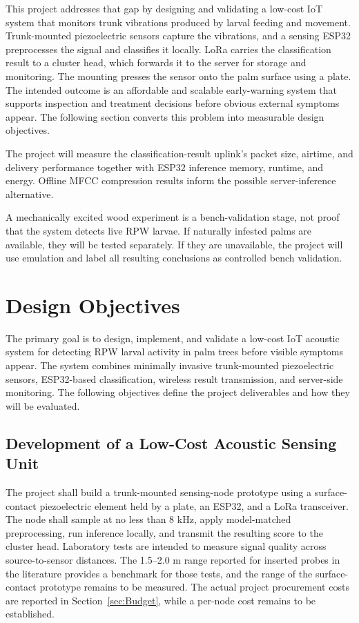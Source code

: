 \documentclass[12pt,a4paper,oneside]{memoir}
\newcommand{\newrevision}[1]{#1}
\begin{document}
\newrevision{This project addresses that gap by designing and validating a low-cost IoT system that monitors trunk vibrations produced by larval feeding and movement. Trunk-mounted piezoelectric sensors capture the vibrations, and a sensing ESP32 preprocesses the signal and classifies it locally. LoRa carries the classification result to a cluster head, which forwards it to the server for storage and monitoring. The mounting presses the sensor onto the palm surface using a plate. The intended outcome is an affordable and scalable early-warning system that supports inspection and treatment decisions before obvious external symptoms appear. The following section converts this problem into measurable design objectives.}

\newrevision{The project will measure the classification-result uplink's packet size, airtime, and delivery performance together with ESP32 inference memory, runtime, and energy. Offline MFCC compression results inform the possible server-inference alternative.}

\newrevision{A mechanically excited wood experiment is a bench-validation stage, not proof that the system detects live RPW larvae. If naturally infested palms are available, they will be tested separately. If they are unavailable, the project will use emulation and label all resulting conclusions as controlled bench validation.}
 
\section{Design Objectives}
\label{sec:Objectives}
 
\newrevision{The primary goal is to design, implement, and validate a low-cost IoT acoustic system for detecting RPW larval activity in palm trees before visible symptoms appear. The system combines minimally invasive trunk-mounted piezoelectric sensors, ESP32-based classification, wireless result transmission, and server-side monitoring. The following objectives define the project deliverables and how they will be evaluated.}
 
\subsection{Development of a Low-Cost Acoustic Sensing Unit}
 
\newrevision{The project shall build a trunk-mounted sensing-node prototype using a surface-contact piezoelectric element held by a plate, an ESP32, and a LoRa transceiver. The node shall sample at no less than 8 kHz, apply model-matched preprocessing, run inference locally, and transmit the resulting score to the cluster head. Laboratory tests are intended to measure signal quality across source-to-sensor distances. The 1.5--2.0 m range reported for inserted probes in the literature provides a benchmark for those tests, and the range of the surface-contact prototype remains to be measured. The actual project procurement costs are reported in Section~\ref{sec:Budget}, while a per-node cost remains to be established.}
 
\end{document}
